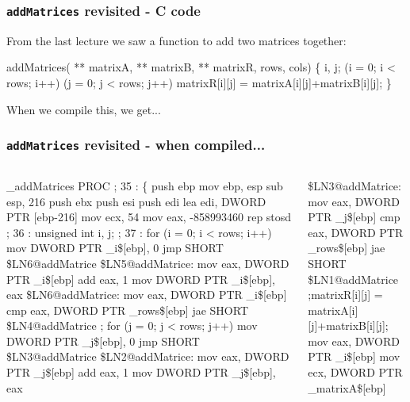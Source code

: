 \documentclass[smaller,table]{beamer} %
\begin{document}
\begin{frame}[fragile]
\frametitle{{\tt addMatrices} revisited - C code}
From the last lecture we saw a function to add two matrices together:
\begin{semiverbatim}
\small
{} addMatrices( ** matrixA,  ** matrixB,
                  ** matrixR,
                  rows,  cols)
\{
    i, j;
    (i = 0; i < rows; i++)
       (j = 0; j < rows; j++)
         matrixR[i][j] = matrixA[i][j]+matrixB[i][j];
\}
\end{semiverbatim}
When we compile this, we get...
\end{frame}

\begin{frame}[fragile]
\frametitle{{\tt addMatrices} revisited - when compiled...}
\begin{columns}
\begin{column}{5cm}
\vspace{-0.2in}
\begin{semiverbatim}
\tiny
_addMatrices PROC
; 35   : \{
        push    ebp
        mov     ebp, esp
        sub     esp, 216
        push    ebx
        push    esi
        push    edi
        lea     edi, DWORD PTR [ebp-216]
        mov     ecx, 54
        mov     eax, -858993460
        rep stosd
; 36   :        unsigned int i, j;
; 37   :        for (i = 0; i < rows; i++)
        mov     DWORD PTR \_i\$[ebp], 0
        jmp     SHORT \$LN6@addMatrice
\$LN5@addMatrice:
        mov     eax, DWORD PTR \_i\$[ebp]
        add     eax, 1
        mov     DWORD PTR \_i\$[ebp], eax
\$LN6@addMatrice:
        mov     eax, DWORD PTR \_i\$[ebp]
        cmp     eax, DWORD PTR \_rows\$[ebp]
        jae     SHORT \$LN4@addMatrice
; for (j = 0; j < rows; j++)
        mov     DWORD PTR \_j\$[ebp], 0
        jmp     SHORT \$LN3@addMatrice
\$LN2@addMatrice:
        mov     eax, DWORD PTR \_j\$[ebp]
        add     eax, 1
        mov     DWORD PTR \_j\$[ebp], eax
\end{semiverbatim}
\end{column}
\begin{column}{5cm}
\vspace{-0.2in}
\begin{semiverbatim}
\tiny
\$LN3@addMatrice:
        mov     eax, DWORD PTR \_j\$[ebp]
        cmp     eax, DWORD PTR _rows\$[ebp]
        jae     SHORT \$LN1@addMatrice
;matrixR[i][j] = matrixA[i][j]+matrixB[i][j];
        mov     eax, DWORD PTR \_i\$[ebp]
        mov     ecx, DWORD PTR \_matrixA\$[ebp]

\end{semiverbatim}
\end{column}
\end{columns}
\end{frame}
\end{document}
